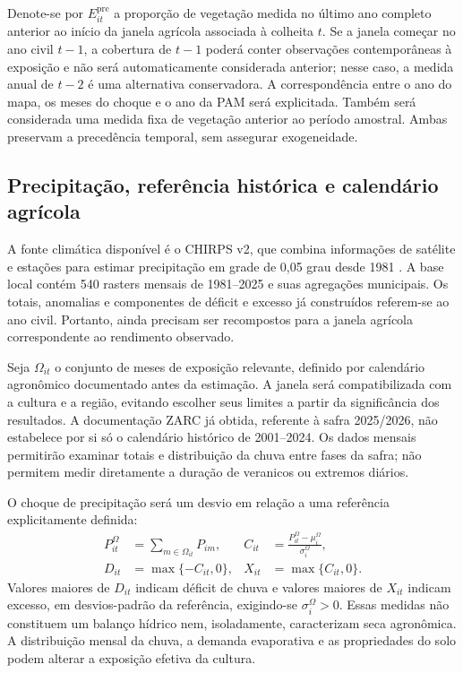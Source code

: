 Denote-se por $E^{\mathrm{pre}}_{it}$ a proporção de vegetação medida no último ano completo anterior ao início da janela agrícola associada à colheita $t$. Se a janela começar no ano civil $t-1$, a cobertura de $t-1$ poderá conter observações contemporâneas à exposição e não será automaticamente considerada anterior; nesse caso, a medida anual de $t-2$ é uma alternativa conservadora. A correspondência entre o ano do mapa, os meses do choque e o ano da PAM será explicitada. Também será considerada uma medida fixa de vegetação anterior ao período amostral. Ambas preservam a precedência temporal, sem assegurar exogeneidade.

\subsection{Precipitação, referência histórica e calendário agrícola}

A fonte climática disponível é o CHIRPS v2, que combina informações de satélite e estações para estimar precipitação em grade de 0,05 grau desde 1981 \cite{CHIRPSv2}. A base local contém 540 rasters mensais de 1981--2025 e suas agregações municipais. Os totais, anomalias e componentes de déficit e excesso já construídos referem-se ao ano civil. Portanto, ainda precisam ser recompostos para a janela agrícola correspondente ao rendimento observado.

Seja $\Omega_{it}$ o conjunto de meses de exposição relevante, definido por calendário agronômico documentado antes da estimação. A janela será compatibilizada com a cultura e a região, evitando escolher seus limites a partir da significância dos resultados. A documentação ZARC já obtida, referente à safra 2025/2026, não estabelece por si só o calendário histórico de 2001--2024. Os dados mensais permitirão examinar totais e distribuição da chuva entre fases da safra; não permitem medir diretamente a duração de veranicos ou extremos diários.

O choque de precipitação será um desvio em relação a uma referência explicitamente definida:
\begin{align}
P^{\Omega}_{it}&=\sum_{m\in\Omega_{it}}P_{im}, &
C_{it}&=\frac{P^{\Omega}_{it}-\mu_i^{\Omega}}{\sigma_i^{\Omega}},
\label{eq:choque}\\
D_{it}&=\max\{-C_{it},0\}, &
X_{it}&=\max\{C_{it},0\}.
\label{eq:deficitexcesso}
\end{align}
Valores maiores de $D_{it}$ indicam déficit de chuva e valores maiores de $X_{it}$ indicam excesso, em desvios-padrão da referência, exigindo-se $\sigma_i^{\Omega}>0$. Essas medidas não constituem um balanço hídrico nem, isoladamente, caracterizam seca agronômica. A distribuição mensal da chuva, a demanda evaporativa e as propriedades do solo podem alterar a exposição efetiva da cultura.

